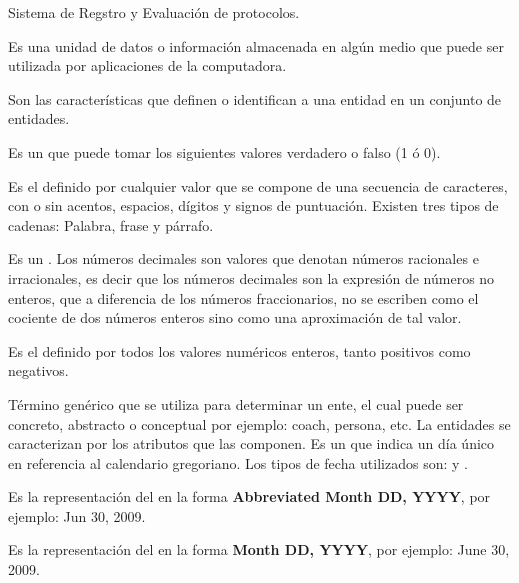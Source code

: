 	\begin{description}
		 Sistema de Regstro y Evaluación de protocolos.
	
	     Es una unidad de datos o información almacenada 
	            en algún medio que puede ser utilizada por aplicaciones de la computadora. 
	    
		 Son las características que definen o identifican a una entidad en un conjunto de entidades.
	
		 Es un  que puede tomar los siguientes valores verdadero o falso (1 ó 0).
		
		 Es el  definido por cualquier valor que se compone de una secuencia de caracteres, con o sin acentos, espacios, dígitos y signos de puntuación. Existen tres tipos de cadenas: Palabra, frase y párrafo.
		
		 Es un  . Los números decimales son valores que denotan números racionales e irracionales, es decir que los números decimales son la expresión de números no enteros, que a diferencia de los números fraccionarios, no se escriben como el cociente de dos números enteros sino como una aproximación de tal valor.
		
		 Es el   definido por todos los valores numéricos enteros, tanto positivos como negativos.

		 Término genérico que se utiliza para determinar un ente, el cual puede ser concreto, abstracto o conceptual por ejemplo: coach, persona, etc. La entidades se caracterizan por los atributos que las componen.
		 Es un  que indica un día único en referencia al calendario gregoriano. Los tipos de fecha utilizados son:  y . %

		 Es la representación del   en la forma \textbf{Abbreviated Month DD, YYYY}, por ejemplo: Jun 30, 2009.

		 Es la representación del   en la forma \textbf{Month DD, YYYY}, por ejemplo: June 30, 2009.


\end{description}
